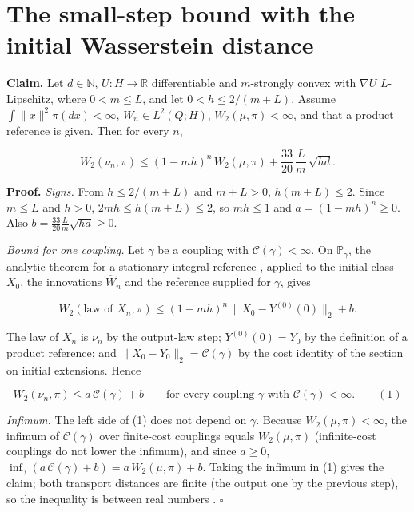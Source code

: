 \documentclass[11pt,a4paper]{article}
\begin{document}
\section{\texorpdfstring{The small-step bound with the initial Wasserstein distance}{The small-step bound with the initial Wasserstein distance}}


\textbf{Claim.} Let \(d\in\mathbb N\), \(U:H\to\mathbb R\) differentiable and \(m\)-strongly convex with \(\nabla U\) \(L\)-Lipschitz, where \(0<m\le L\), and let \(0<h\le2/(m+L)\). Assume \(\int\|x\|^2\pi(dx)<\infty\), \(W_n\in L^2(Q;H)\), \(W_2(\mu,\pi)<\infty\), and that a product reference is given. Then for every \(n\),


\[W_2(\nu_n,\pi)\le(1-mh)^n\,W_2(\mu,\pi)+\frac{33}{20}\,\frac Lm\,\sqrt{hd}.\]


\textbf{Proof.} \emph{Signs.} From \(h\le2/(m+L)\) and \(m+L>0\), \(h(m+L)\le2\). Since \(m\le L\) and \(h>0\), \(2mh\le h(m+L)\le2\), so \(mh\le1\) and \(a=(1-mh)^n\ge0\). Also \(b=\frac{33}{20}\frac Lm\sqrt{hd}\ge0\).




\emph{Bound for one coupling.} Let \(\gamma\) be a coupling with \(\mathcal C(\gamma)<\infty\). On \(\mathbb P_\gamma\), the analytic theorem for a stationary integral reference \cite[Section~3.19.5]{LangevinLean2026ULASC}, applied to the initial class \(X_0\), the innovations \(\widehat W_n\) and the reference supplied for \(\gamma\), gives


\[W_2(\text{law of }X_n,\pi)\le(1-mh)^n\,\|X_0-Y^{(0)}(0)\|_2+b .\]


The law of \(X_n\) is \(\nu_n\) by the output-law step; \(Y^{(0)}(0)=Y_0\) by the definition of a product reference; and \(\|X_0-Y_0\|_2=\mathcal C(\gamma)\) by the cost identity of the section on initial extensions. Hence


\[W_2(\nu_n,\pi)\le a\,\mathcal C(\gamma)+b\qquad\text{for every coupling }\gamma\text{ with }\mathcal C(\gamma)<\infty.\qquad(1)\]


\emph{Infimum.} The left side of (1) does not depend on \(\gamma\). Because \(W_2(\mu,\pi)<\infty\), the infimum of \(\mathcal C(\gamma)\) over finite-cost couplings equals \(W_2(\mu,\pi)\) (infinite-cost couplings do not lower the infimum), and since \(a\ge0\), \(\inf_\gamma(a\,\mathcal C(\gamma)+b)=a\,W_2(\mu,\pi)+b\). Taking the infimum in (1) gives the claim; both transport distances are finite (the output one by the previous step), so the inequality is between real numbers \cite[Section~3.18.4]{LangevinLean2026ULASC}. \(\square\)
\end{document}
